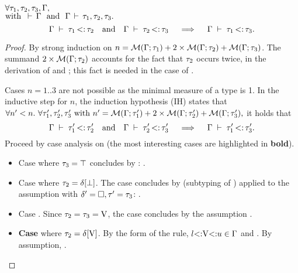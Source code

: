 \begin{theorem}\label{thm:sub-ty-trans}
    $\forall \tau_1, \tau_2, \tau_3, \Gamma,$\\ $\text{with }
    \,\vdash\,\Gamma\ \text{ and }\ \Gamma\,\vdash\,\tau_1, \tau_2, \tau_3.$
    \[
        \subtydflt{\ty_1}{\ty_2} \ \ \text{ and }\ \  \subtydflt{\ty_2}{\ty_3}
        \quad\implies\quad
        \subtydflt{\ty_1}{\ty_3}.
    \]
\end{theorem}
\begin{proof}
    By strong induction on
    $n = \operatorname{\mathcal{M}}(\Gamma;\tau_1) + 2\times\operatorname{\mathcal{M}}(\Gamma;\tau_2) + \operatorname{\mathcal{M}}(\Gamma;\tau_3)$.
    The summand $2\times\operatorname{\mathcal{M}}(\Gamma;\tau_2)$ accounts for the fact that $\tau_2$ 
    occurs twice, in the derivation of  and 
    ; this fact is needed in the case 
    of .

    Cases $n = 1..3$ are not possible as the minimal measure of a type is 1.
    In the inductive step for $n$, the induction hypothesis (IH) states that
    $\forall n'<n.\ \forall \tau'_1, \tau'_2, \tau'_3 \text{ with }
    n' = \operatorname{\mathcal{M}}(\Gamma;\tau'_1) + 2\times\operatorname{\mathcal{M}}(\Gamma;\tau'_2) + \operatorname{\mathcal{M}}(\Gamma;\tau'_3),$
    it holds that
    \[
        \subtydflt{\ty'_1}{\ty'_2} \ \ \text{ and }\ \  \subtydflt{\ty'_2}{\ty'_3}
        \quad\implies\quad
        \subtydflt{\ty'_1}{\ty'_3}.
    \]
    Proceed by case analysis on  (the most interesting 
    cases are highlighted in \textbf{bold}).
    \begin{itemize}
        \item Case   where $\tau_3 = \top$
            concludes by : .
        \item Case  
            where $\tau_2=\delta[\bot]$.
            The case concludes by 
            (subtyping of \tybot) applied
            to the assumption 
            with $\delta' = \square, \tau' = \tau_3$:
            .
        \item Case  \subtydflt{\vany}{\vany}.
            Since $\tau_2=\tau_3=\mathrm{V}$, the case concludes by the assumption
            .
        \item \textbf{Case }  
            where $\tau_2 = \delta[\mathrm{V}]$.
            By the form of the rule, $l{\operatorname{<:}}\mathrm{V}{\operatorname{<:}}u \in \Gamma$ and
            .
            By assumption, .


\end{itemize}
\end{proof}
